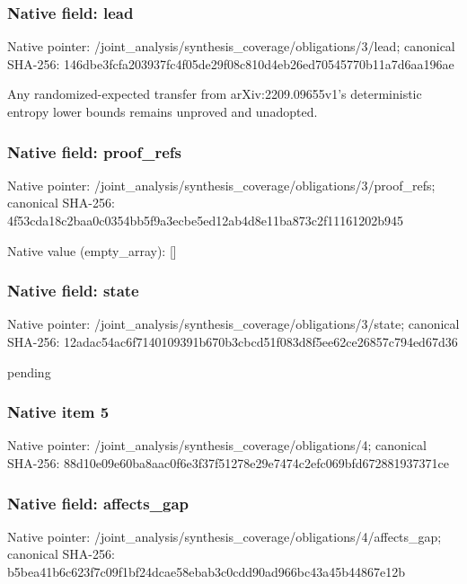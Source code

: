 \documentclass[10pt,a4paper]{article}
\begin{document}
\subsubsection{Native field: lead}
Native pointer: /joint\_\allowbreak{}analysis/synthesis\_\allowbreak{}coverage/obligations/3/lead; canonical SHA-256: 146dbe3fcfa203937fc4f05de29f08c810d4eb26ed70545770b11a7d6aa196ae

\begingroup\raggedright\sloppy Any randomized-expected transfer from arXiv:\allowbreak{}2209.09655v1's deterministic entropy lower bounds remains unproved and unadopted.\par\endgroup

\subsubsection{Native field: proof\_\allowbreak{}refs}
Native pointer: /joint\_\allowbreak{}analysis/synthesis\_\allowbreak{}coverage/obligations/3/proof\_\allowbreak{}refs; canonical SHA-256: 4f53cda18c2baa0c0354bb5f9a3ecbe5ed12ab4d8e11ba873c2f11161202b945

Native value (empty\_\allowbreak{}array): []

\subsubsection{Native field: state}
Native pointer: /joint\_\allowbreak{}analysis/synthesis\_\allowbreak{}coverage/obligations/3/state; canonical SHA-256: 12adac54ac6f7140109391b670b3cbcd51f083d8f5ee62ce26857c794ed67d36

\begingroup\raggedright\sloppy pending\par\endgroup

\subsubsection{Native item 5}
Native pointer: /joint\_\allowbreak{}analysis/synthesis\_\allowbreak{}coverage/obligations/4; canonical SHA-256: 88d10e09e60ba8aac0f6e3f37f51278e29e7474c2efc069bfd672881937371ce

\subsubsection{Native field: affects\_\allowbreak{}gap}
Native pointer: /joint\_\allowbreak{}analysis/synthesis\_\allowbreak{}coverage/obligations/4/affects\_\allowbreak{}gap; canonical SHA-256: b5bea41b6c623f7c09f1bf24dcae58ebab3c0cdd90ad966bc43a45b44867e12b
\end{document}
